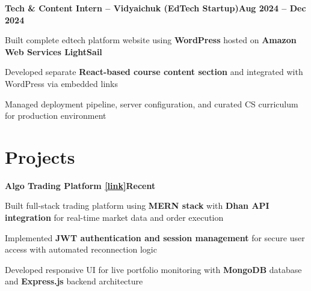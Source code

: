 \documentclass[letterpaper,10pt]{article}
\newcommand{\heading}[2]{
  \hspace{10pt}#1\hfill#2\\
}
\newcommand{\headingBf}[2]{
  \heading{\textbf{#1}}{\textbf{#2}}
}
\newenvironment{resume_list}{
  \vspace{-7pt}
  \begin{itemize}[itemsep=-2px, parsep=1pt, leftmargin=30pt]
}{
  \end{itemize}
}
\begin{document}
  \headingBf{Tech \& Content Intern -- Vidyaichuk (EdTech Startup)}{Aug 2024 -- Dec 2024}
  \begin{resume_list}
    \item Built complete edtech platform website using \textbf{WordPress} hosted on \textbf{Amazon Web Services LightSail}
    \item Developed separate \textbf{React-based course content section} and integrated with WordPress via embedded links
    \item Managed deployment pipeline, server configuration, and curated CS curriculum for production environment
  \end{resume_list}


  \section{Projects}


  \headingBf{Algo Trading Platform \href{https://github.com/sng-aditya/AvanceAI}{[link]}}{Recent}
  \begin{resume_list}
    \item Built full-stack trading platform using \textbf{MERN stack} with \textbf{Dhan API integration} for real-time market data and order execution
    \item Implemented \textbf{JWT authentication and session management} for secure user access with automated reconnection logic
    \item Developed responsive UI for live portfolio monitoring with \textbf{MongoDB} database and \textbf{Express.js} backend architecture
  \end{resume_list}
\end{document}
